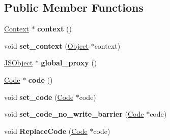 \subsection*{Public Member Functions}
\begin{DoxyCompactItemize}
\item 
\hypertarget{classv8_1_1internal_1_1_j_s_function_a058051825db659b76fc31531e444e3bc}{}\hyperlink{classv8_1_1internal_1_1_context}{Context} $\ast$ {\bfseries context} ()\label{classv8_1_1internal_1_1_j_s_function_a058051825db659b76fc31531e444e3bc}

\item 
\hypertarget{classv8_1_1internal_1_1_j_s_function_a3856d2e398406f970572c99fb30cbb1e}{}void {\bfseries set\+\_\+context} (\hyperlink{classv8_1_1internal_1_1_object}{Object} $\ast$context)\label{classv8_1_1internal_1_1_j_s_function_a3856d2e398406f970572c99fb30cbb1e}

\item 
\hypertarget{classv8_1_1internal_1_1_j_s_function_a58af09e1d691648f3b81bd6b1f2fda75}{}\hyperlink{classv8_1_1internal_1_1_j_s_object}{J\+S\+Object} $\ast$ {\bfseries global\+\_\+proxy} ()\label{classv8_1_1internal_1_1_j_s_function_a58af09e1d691648f3b81bd6b1f2fda75}

\item 
\hypertarget{classv8_1_1internal_1_1_j_s_function_ad8b93c5dcdb6a0bf13b7d375ee0a7f70}{}\hyperlink{classv8_1_1internal_1_1_code}{Code} $\ast$ {\bfseries code} ()\label{classv8_1_1internal_1_1_j_s_function_ad8b93c5dcdb6a0bf13b7d375ee0a7f70}

\item 
\hypertarget{classv8_1_1internal_1_1_j_s_function_a12ae75a05a7b879043a2198a0a97a331}{}void {\bfseries set\+\_\+code} (\hyperlink{classv8_1_1internal_1_1_code}{Code} $\ast$code)\label{classv8_1_1internal_1_1_j_s_function_a12ae75a05a7b879043a2198a0a97a331}

\item 
\hypertarget{classv8_1_1internal_1_1_j_s_function_a42dee37aa6d11138494cc13bc0742cbf}{}void {\bfseries set\+\_\+code\+\_\+no\+\_\+write\+\_\+barrier} (\hyperlink{classv8_1_1internal_1_1_code}{Code} $\ast$code)\label{classv8_1_1internal_1_1_j_s_function_a42dee37aa6d11138494cc13bc0742cbf}

\item 
\hypertarget{classv8_1_1internal_1_1_j_s_function_a4f36d84e06ec46f4f5373dcba94076d3}{}void {\bfseries Replace\+Code} (\hyperlink{classv8_1_1internal_1_1_code}{Code} $\ast$code)\label{classv8_1_1internal_1_1_j_s_function_a4f36d84e06ec46f4f5373dcba94076d3}


\end{DoxyCompactItemize}
